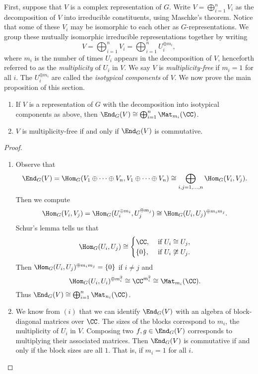 First, suppose that $V$ is a complex representation of $G$.
Write $V = \bigoplus_{i=1}^n V_i$ as the decomposition of $V$ into irreducible constituents, using Maschke's theorem.
Notice that some of these $V_i$ may be isomorphic to each other as $G$-representations.
We group these mutually isomorphic irreducible representations together by writing
\[
    V = \bigoplus_{i=1}^n V_i = \bigoplus_{i=1}^n U_i^{\oplus m_i},
\]
where $m_i$ is the number of times $U_i$ appears in the decomposition of $V$, henceforth referred to as the \emph{multiplicity} of $U_i$ in $V$.
We say $V$ is \emph{multiplicity-free} if $m_i=1$ for all $i$.
The $U_i^{\oplus m_i}$ are called the \emph{isotypical components} of $V$.
We now prove the main proposition of this section.
\begin{prop}\label{prop: V_mult-free_iff_End_G(V)_commutative}
    \begin{enumerate}[\itshape(i)]
        \item If $V$ is a representation of $G$ with the decomposition into isotypical components as above, then $\End_G(V)\cong \bigoplus_{i=1}^n \Mat_{m_i}(\CC)$.
        \item $V$ is multiplicity-free if and only if $\End_G(V)$ is commutative.
    \end{enumerate}
\end{prop}
\begin{proof}
    \begin{enumerate}[\itshape(i)]
        \item Observe that
              \[
                  \End_G(V) = \Hom_G(V_1\oplus \cdots \oplus V_n, V_1\oplus \cdots \oplus V_n) \cong \bigoplus_{i,j=1,\ldots,n} \Hom_G(V_i, V_j).
              \]
              Then we compute
              \[
                  \Hom_G(V_i,V_j) = \Hom_G(U_i^{\oplus m_i}, U_j^{\oplus m_j}) \cong \Hom_G(U_i,U_j)^{\oplus m_im_j}.
              \]
              Schur's lemma tells us that
              \[
                  \Hom_G(U_i,U_j) \cong \begin{cases}
                      \CC,\    & \text{if}\ U_i\cong U_j,     \\
                      \{0\},\  & \text{if}\ U_i\not\cong U_j.
                  \end{cases}
              \]
              Then $\Hom_G(U_i,U_j)^{\oplus m_im_j} =\{0\}$ if $i\neq j$ and
              \[
                  \Hom_G(U_i,U_i)^{\oplus m_i^2} \cong \CC^{m_i^2} \cong \Mat_{m_i}(\CC).
              \]
              Thus $\End_G(V) \cong \bigoplus_{i=1}^n \Mat_{n_i}(\CC)$.

        \item We know from $(i)$ that we can identify $\End_G(V)$ with an algebra of block-diagonal matrices over $\CC$.
              The sizes of the blocks correspond to $m_i$, the multiplicity of $U_i$ in $V$.
              Composing two $f,g\in\End_G(V)$ corresponds to multiplying their associated matrices.
              Then $\End_G(V)$ is commutative if and only if the block sizes are all $1$.
              That is, if $m_i = 1$ for all $i$. \qedhere
    \end{enumerate}
\end{proof}
